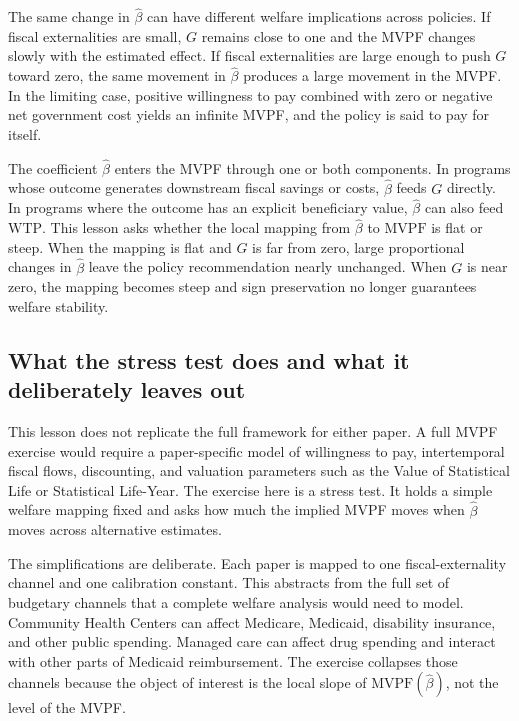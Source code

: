 The same change in \(\hat\beta\) can have different welfare implications across policies. If fiscal externalities are small, \(G\) remains close to one and the MVPF changes slowly with the estimated effect. If fiscal externalities are large enough to push \(G\) toward zero, the same movement in \(\hat\beta\) produces a large movement in the MVPF. In the limiting case, positive willingness to pay combined with zero or negative net government cost yields an infinite MVPF, and the policy is said to pay for itself.

The coefficient \(\hat\beta\) enters the MVPF through one or both components. In programs whose outcome generates downstream fiscal savings or costs, \(\hat\beta\) feeds \(G\) directly. In programs where the outcome has an explicit beneficiary value, \(\hat\beta\) can also feed \(\mathrm{WTP}\). This lesson asks whether the local mapping from \(\hat\beta\) to \(\mathrm{MVPF}\) is flat or steep. When the mapping is flat and \(G\) is far from zero, large proportional changes in \(\hat\beta\) leave the policy recommendation nearly unchanged. When \(G\) is near zero, the mapping becomes steep and sign preservation no longer guarantees welfare stability.



\subsection{What the stress test does and what it deliberately leaves out}

This lesson does not replicate the full \textcite{hendren2020unified} framework for either paper. A full MVPF exercise would require a paper-specific model of willingness to pay, intertemporal fiscal flows, discounting, and valuation parameters such as the Value of Statistical Life or Statistical Life-Year. The exercise here is a stress test. It holds a simple welfare mapping fixed and asks how much the implied MVPF moves when \(\hat\beta\) moves across alternative estimates.

The simplifications are deliberate. Each paper is mapped to one fiscal-externality channel and one calibration constant. This abstracts from the full set of budgetary channels that a complete welfare analysis would need to model. Community Health Centers can affect Medicare, Medicaid, disability insurance, and other public spending. Managed care can affect drug spending and interact with other parts of Medicaid reimbursement. The exercise collapses those channels because the object of interest is the local slope of \(\mathrm{MVPF}(\hat\beta)\), not the level of the MVPF.

